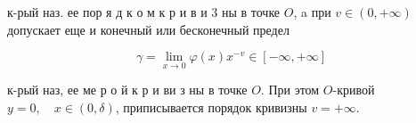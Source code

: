 \documentclass[10pt]{article}
\begin{document}
к-рый наз. ее $п о р$ я д к о м к р и в и 3 ны в точке $O$, a при $v \in(0,+\infty)$ допускает еще и конечный или бесконечный предел



\[

\gamma=\lim _{x \rightarrow 0} \varphi(x) x^{-v} \in[-\infty,+\infty]

\]



к-рый наз, ее ме р о й к р и ви з ны в точке $O$. При этом $O$-кривой $y=0, \quad x \in(0, \delta)$, приписывается порядок кривизны $v=+\infty$.
\end{document}
